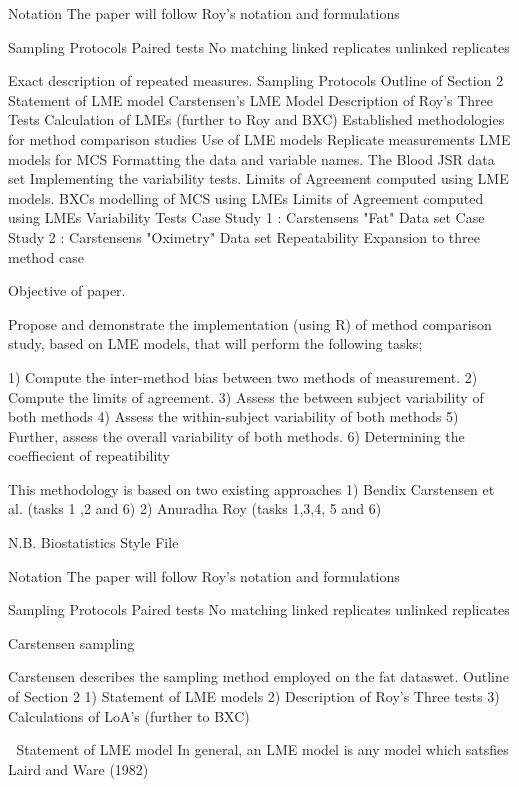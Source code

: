 Notation
The paper will follow Roy's notation and formulations

Sampling Protocols  
Paired tests
No matching
linked replicates
unlinked replicates
 

 
 
 
Exact description of repeated measures.
Sampling Protocols
Outline of Section 2
Statement of LME model
Carstensen's LME Model
Description of Roy's Three Tests
Calculation of LMEs (further to Roy and BXC)
Established methodologies for method comparison studies
Use of LME models
Replicate measurements
LME models for MCS
Formatting the data and variable names.
The Blood JSR data set
Implementing the variability tests.
Limits of Agreement computed using LME models.
BXCs modelling of MCS using LMEs
Limits of Agreement computed using LMEs
Variability Tests
Case Study 1 : Carstensens "Fat" Data set
Case Study 2 : Carstensens "Oximetry" Data set
Repeatability
Expansion to three method case
 
 
Objective of paper.
 
Propose and demonstrate the implementation (using R) of method comparison study, based on LME models, that will perform the following tasks;
 
1) Compute the inter-method bias between two methods of measurement.
2) Compute the limits of agreement.
3) Assess the between subject variability of both methods
4) Assess the within-subject variability of both methods
5) Further, assess the overall variability of both methods.
6) Determining the coeffiecient of repeatibility
 
This methodology is based on two existing approaches
1) Bendix Carstensen et al.      (tasks 1 ,2 and 6)
2) Anuradha Roy                    (tasks 1,3,4, 5 and 6)
 
 
    N.B. Biostatistics Style File 
 
Notation
The paper will follow Roy's notation and formulations

Sampling Protocols  
Paired tests
No matching
linked replicates
unlinked replicates
 
Carstensen sampling
 
Carstensen describes the sampling method employed on the fat dataswet.
Outline of Section 2
1) Statement of LME models
2) Description of Roy's Three tests
3) Calculations of LoA's (further to BXC)
 
 
Statement of LME model
In general, an LME model is any model which satsfies Laird and Ware (1982)
 
